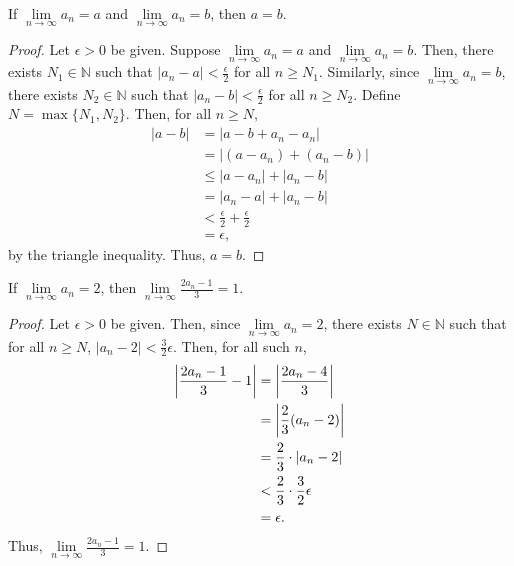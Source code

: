 \documentclass[12pt]{article}
\begin{document}
\newpage
{} If $\lim\limits_{n\to\infty}a_n = a$ and $\lim\limits_{n\to\infty}a_n = b$, then $a = b$.
\begin{proof}
    Let $\epsilon > 0$ be given. Suppose $\lim\limits_{n\to\infty}a_n = a$ and $\lim\limits_{n\to\infty}a_n = b$. Then, there exists $N_1 \in \mathbb N$ such that $|a_n - a| < \frac\epsilon2$ for all $n \geq N_1$. Similarly, since $\lim\limits_{n\to\infty}a_n = b$, there exists $N_2 \in \mathbb N$ such that  $|a_n - b| < \frac\epsilon2$ for all $n \geq N_2$. Define $N = \max\{N_1, N_2\}$. Then, for all $n \geq N$,
    \begin{align*}
        |a - b| &= |a - b + a_n - a_n| \\
                &= |(a - a_n) + (a_n - b)| \\
                &\leq |a - a_n| + | a_n - b| \\
                &= |a_n - a| + |a_n - b| \\
                &< \frac\epsilon2 + \frac\epsilon2 \\
                &= \epsilon,
    \end{align*}
    by the triangle inequality. Thus, $a = b$.
\end{proof}


\newpage
{} If $\lim\limits_{n\to\infty} a_n = 2$, then $\lim\limits_{n\to\infty}\frac{2a_n-1}{3} = 1$.
\begin{proof}
    Let $\epsilon > 0$ be given. Then, since $\lim\limits_{n\to\infty} a_n = 2$, there exists $N \in \mathbb N$ such that for all $n \geq N$, $|a_n - 2| < \frac32\epsilon$. Then, for all such $n$,
    \begin{align*}
        \bigg{|}\frac{2a_n-1}{3} - 1 \bigg{|} &= \bigg{|}\frac{2a_n - 4}{3} \bigg{|}\\
                                              &= \bigg{|}\frac23(a_n - 2) \bigg{|} \\
                                              &= \frac23 \cdot |a_n - 2| \\
                                              &< \frac23\cdot\frac32\epsilon \\
                                              &= \epsilon.
    \end{align*}
    Thus, $\lim\limits_{n\to\infty}\frac{2a_n-1}{3} = 1$.
\end{proof}
\end{document}
